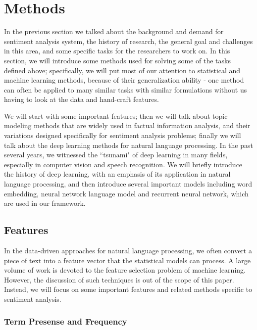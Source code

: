 \chapter{Methods}

In the previous section we talked about the background and demand for sentiment analysis system, the history of research, the general goal and challenges in this area, and some specific tasks for the researchers to work on. In this section, we will introduce some methods used for solving some of the tasks defined above; specifically, we will put most of our attention to statistical and machine learning methods, because of their generalization ability - one method can often be applied to many similar tasks with similar formulations without us having to look at the data and hand-craft features.

We will start with some important features; then we will talk about topic modeling methods that are widely used in factual information analysis, and their variations designed specifically for sentiment analysis problems; finally we will talk about the deep learning methods for natural language processing. In the past several years, we witnessed the ``tsunami" of deep learning in many fields, especially in computer vision and speech recognition. We will briefly introduce the history of deep learning, with an emphasis of its application in natural language processing, and then introduce several important models including word embedding, neural network language model and recurrent neural network, which are used in our framework.

\section{Features}

In the data-driven approaches for natural language processing, we often convert a piece of text into a feature vector that the statistical models can process. A large volume of work is devoted to the feature selection problem of machine learning. However, the discussion of such techniques is out of the scope of this paper. Instead, we will focus on some important features and related methods specific to sentiment analysis.

\subsection{Term Presense and Frequency}

